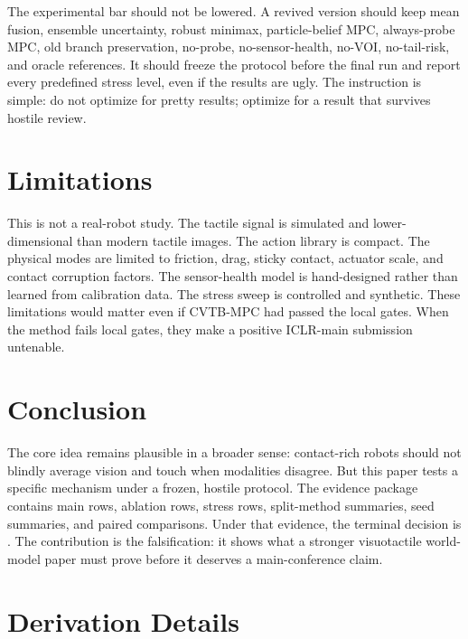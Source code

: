 \documentclass{article}
\newcommand{\method}{\textsc{CVTB-MPC}}
\begin{document}
The experimental bar should not be lowered. A revived version should keep mean fusion, ensemble uncertainty, robust minimax, particle-belief MPC, always-probe MPC, old branch preservation, no-probe, no-sensor-health, no-VOI, no-tail-risk, and oracle references. It should freeze the protocol before the final run and report every predefined stress level, even if the results are ugly. The instruction is simple: do not optimize for pretty results; optimize for a result that survives hostile review.

\section{Limitations}



This is not a real-robot study. The tactile signal is simulated and lower-dimensional than modern tactile images. The action library is compact. The physical modes are limited to friction, drag, sticky contact, actuator scale, and contact corruption factors. The sensor-health model is hand-designed rather than learned from calibration data. The stress sweep is controlled and synthetic. These limitations would matter even if \method{} had passed the local gates. When the method fails local gates, they make a positive ICLR-main submission untenable.

\section{Conclusion}

The core idea remains plausible in a broader sense: contact-rich robots should not blindly average vision and touch when modalities disagree. But this paper tests a specific mechanism under a frozen, hostile protocol. The evidence package contains \MainRows{} main rows, \AblationRows{} ablation rows, \StressRows{} stress rows, \MetricRows{} split-method summaries, \SeedRows{} seed summaries, and \PairwiseRows{} paired comparisons. Under that evidence, the terminal decision is \PaperDecision{}. The contribution is the falsification: it shows what a stronger visuotactile world-model paper must prove before it deserves a main-conference claim.

\clearpage
\appendix

\section{Derivation Details}
\end{document}

